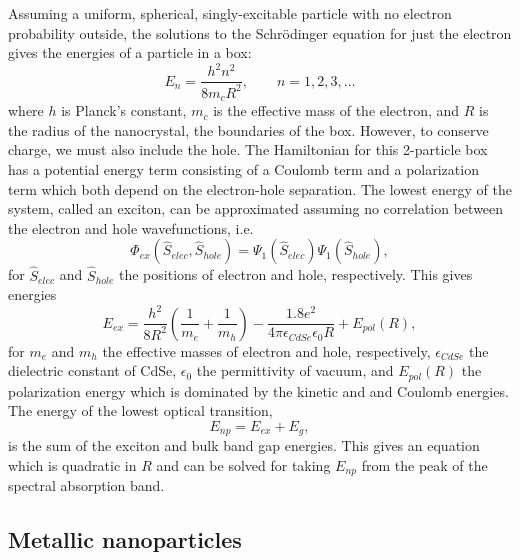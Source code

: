 \documentclass{article}
\begin{document}
Assuming a uniform, spherical, singly-excitable particle with no electron probability outside,
the solutions to the Schr\"odinger equation for just the electron gives the energies of a
particle in a box:
\begin{equation}
E_n=\frac{h^2n^2}{8 m_c R^2}, \qquad n=1,2,3,\ldots
\end{equation}
where $h$ is Planck's constant, $m_c$ is the effective mass of the electron, and
$R$ is the radius of the nanocrystal, the boundaries of the box. However, to conserve charge,
we must also include the hole. The Hamiltonian for this 2-particle box has a potential energy
term consisting of a Coulomb term and a polarization term which both depend on the
electron-hole separation. The lowest energy of the system, called an exciton, can be 
approximated assuming no correlation between the electron and hole wavefunctions, i.e.
\begin{equation}
\Phi_{ex}(\hat{S}_{elec},\hat{S}_{hole})=\Psi_1(\hat{S}_{elec})\Psi_1(\hat{S}_{hole}),
\end{equation}
for $\hat{S}_{elec}$ and $\hat{S}_{hole}$ the positions of electron and hole, respectively.
This gives energies
\begin{equation}
E_{ex}=\frac{h^2}{8 R^2}\left(\frac{1}{m_e}+\frac{1}{m_h}\right)
-\frac{1.8 e^2}{4\pi\epsilon_{CdSe}\epsilon_0 R}+E_{pol}(R),
\end{equation}
for $m_e$ and $m_h$ the effective masses of electron and hole, respectively,
$\epsilon_{CdSe}$ the dielectric constant of CdSe, $\epsilon_0$ the permittivity of
vacuum, and $E_{pol}(R)$ the polarization energy which is dominated by the kinetic and
and Coulomb energies.
The energy of the lowest optical transition,
\begin{equation}
E_{np}=E_{ex}+E_g,
\end{equation}
is the sum of the exciton and bulk band
gap energies. This gives an equation which is quadratic in $R$ and can be solved for taking
$E_{np}$ from the peak of the spectral absorption band.

\subsection{Metallic nanoparticles}
\end{document}
